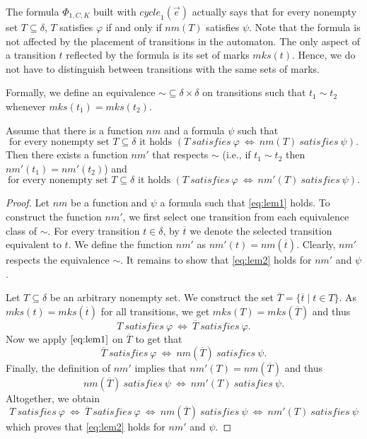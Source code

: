 \documentclass[a4paper,UKenglish,cleveref,autoref,thm-restate]{lipics-v2021}
\newcommand{\mks}{\mathit{mks}}
\newcommand{\rem}{\mathit{nm}}
\newcommand{\mcycle}{\mathit{cycle}}
\newcommand{\msat}{\mathit{satisfies}}
\begin{document}
The formula $\Phi_{1,C,K}$ built with $\mcycle_1(\vec{e})$ actually
says that for every nonempty set $T\subseteq\delta$, $T$ satisfies
$\varphi$ if and only if $\rem(T)$ satisfies $\psi$. Note that the
formula is not affected by the placement of transitions in the
automaton. The only aspect of a transition $t$ reflected by the
formula is its set of marks $\mks(t)$. Hence, we do not have to
distinguish between transitions with the same sets of marks.

Formally, we define an equivalence ${\sim}\subseteq\delta\times\delta$
on transitions such that $t_1\sim t_2$ whenever $\mks(t_1)=\mks(t_2)$.
\begin{lemma}
  Assume that there is a function $\rem$ and a formula $\psi$ such that 
  \[
    \textrm{for every nonempty set $T\subseteq\delta$ it holds }
      (T~\msat~\varphi~\iff~\rem(T)~\msat~\psi).\tag{$1$}\label{eq:lem1} 
  \]  
  Then there exists a function $\rem'$ that respects %
  $\sim$ (i.e.,
  if $t_1\sim t_2$ then $\rem'(t_1)=\rem'(t_2)$) and
  \[
    \textrm{for every nonempty set $T\subseteq\delta$ it holds }
    (T~\msat~\varphi~\iff~\rem'(T)~\msat~\psi).\tag{$2$}\label{eq:lem2} 
  \]  
\end{lemma}
\begin{proof}
  Let $\rem$ be a function and $\psi$ a formula such that
  \eqref{eq:lem1} holds. To construct the function $\rem'$, we first
  select one transition from each equivalence class of $\sim$. For
  every transition $t\in\delta$, by $\overline{t}$ we denote the
  selected transition equivalent to $t$. We define the function
  $\rem'$ as $\rem'(t)=\rem(\overline{t})$. Clearly, $\rem'$ respects
  the equivalence $\sim$. It remains to show that \eqref{eq:lem2}
  holds for $\rem'$ and $\psi$.

  Let $T\subseteq\delta$ be an arbitrary nonempty set. We construct
  the set $\overline{T}=\{\overline{t}\mid t\in T\}$. As
  $\mks(t)=\mks(\overline{t})$ for all transitions, we get
  $\mks(T)=\mks(\overline{T})$ and thus
  \[
    T~\msat~\varphi~\iff~\overline{T}~\msat~\varphi.
  \]
  Now we apply $\eqref{eq:lem1}$ on $\overline{T}$ to get that
  \[
    \overline{T}~\msat~\varphi~\iff~\rem(\overline{T})~\msat~\psi.
  \]
  Finally, the definition of $\rem'$ implies that
  $\rem'(T)=\rem(\overline{T})$ and thus
  \[
    \rem(\overline{T})~\msat~\psi~\iff~\rem'(T)~\msat~\psi.
  \]
  Altogether, we obtain
  \[
    T~\msat~\varphi~\iff~\overline{T}~\msat~\varphi~\iff~\rem(\overline{T})~\msat~\psi~\iff~\rem'(T)~\msat~\psi
  \]
  which proves that \eqref{eq:lem2} holds for $\rem'$ and $\psi$. 
\end{proof}
\end{document}
